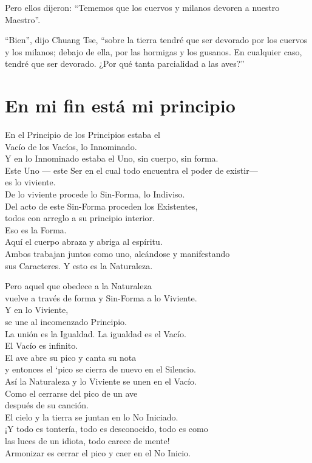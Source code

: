 \documentclass[book,b5paper,hidelinks,final]{memoir}
\begin{document}
	Pero ellos dijeron: ``Tememos que los cuervos y milanos devoren a
	nuestro Maestro''.
	
	``Bien'', dijo Chuang Tse, ``sobre la tierra tendré que ser devorado por
	los cuervos y los milanos; debajo de ella, por las hormigas y los
	gusanos. En cualquier caso, tendré que ser devorado. ¿Por qué tanta
	parcialidad a las aves?''
	
	\chapter*{En mi fin está mi principio}
	
	En el Principio de los Principios estaba el\\
	Vacío de los Vacíos, lo Innominado.\\
	Y en lo Innominado estaba el Uno, sin cuerpo, sin forma.\\
	Este Uno --- este Ser en el cual todo encuentra el poder de existir---\\
	es lo viviente.\\
	De lo viviente procede lo Sin-Forma, lo Indiviso.\\
	Del acto de este Sin-Forma proceden los Existentes,\\
	todos con arreglo a su principio interior.\\
	Eso es la Forma.\\
	Aquí el cuerpo abraza y abriga al espíritu.\\
	Ambos trabajan juntos como uno, aleándose y manifestando\\
	sus Caracteres. Y esto es la Naturaleza.
	
	Pero aquel que obedece a la Naturaleza\\
	vuelve a través de forma y Sin-Forma a lo Viviente.\\
	Y en lo Viviente,\\
	se une al incomenzado Principio.\\
	La unión es la Igualdad. La igualdad es el Vacío.\\
	El Vacío es infinito.\\
	El ave abre su pico y canta su nota\\
	y entonces el `pico se cierra de nuevo en el Silencio.\\
	Así la Naturaleza y lo Viviente se unen en el Vacío.\\
	Como el cerrarse del pico de un ave\\
	después de su canción.\\
	El cielo y la tierra se juntan en lo No Iniciado.\\
	¡Y todo es tontería, todo es desconocido, todo es como\\
	las luces de un idiota, todo carece de mente!\\
	Armonizar es cerrar el pico y caer en el No Inicio.
	
\end{document}
